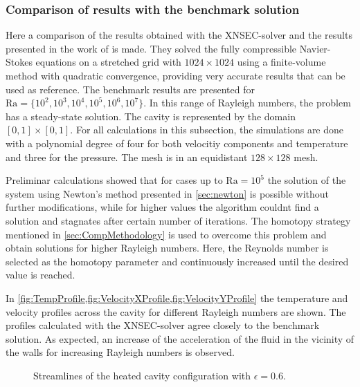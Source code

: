 \subsubsection{Comparison of results with the benchmark solution}

Here a comparison of the results obtained with the XNSEC-solver and the results presented in the work of \cite{vierendeelsBenchmarkSolutionsNatural2003} is made. They solved the fully compressible Navier-Stokes equations on a stretched grid with $1024\times1024$ using a finite-volume method with quadratic convergence, providing very accurate results that can be used as reference.
The benchmark results are presented for $\text{Ra} = \{10^2,10^3,10^4,10^5,10^6,10^7\}$. In this range of Rayleigh numbers, the problem has a steady-state solution. 
The cavity is represented by the domain $[0,1]\times[0,1]$. For all calculations in this subsection, the simulations are done with a polynomial degree of four for both velocitiy components and temperature and three for the pressure. The mesh is in an equidistant $128\times128$ mesh.

Preliminar calculations showed that for cases up to $\text{Ra} = 10^5$ the solution of the system using Newton's method presented in \cref{sec:newton} is possible without further modifications, while for higher values the algorithm couldnt find a solution and stagnates after certain number of iterations. The homotopy strategy mentioned in \cref{sec:CompMethodology} is used to overcome this problem and obtain solutions for higher Rayleigh numbers. Here, the Reynolds number is selected as the homotopy parameter and continuously increased until the desired value is reached.

In \cref{fig:TempProfile,fig:VelocityXProfile,fig:VelocityYProfile} the temperature and velocity profiles across the cavity for different Rayleigh numbers are shown. The profiles calculated with the XNSEC-solver agree closely to the benchmark solution. As expected, an increase of the acceleration of the fluid in the vicinity of the walls for increasing Rayleigh numbers is observed.
\begin{figure}[h]
	\centering
	\pgfplotsset{width=0.3 \textwidth, compat=1.3}
	\caption{Streamlines of the heated cavity configuration with $\epsilon = 0.6$.}\label{fig:HSCStreamlines}
\end{figure}


